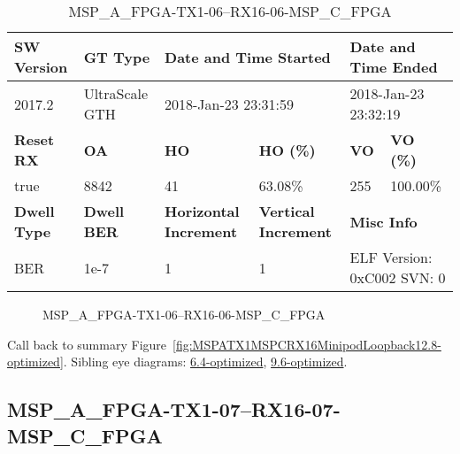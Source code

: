 \begin{table}[h]
\centering
\caption{MSP\_A\_FPGA-TX1-06--RX16-06-MSP\_C\_FPGA}
\label{tab:MSPAFPGATX106RX1606MSPCFPGA12.8-optimized}
\begin{tabular}{@{}|l|l|l|l|l|l|@{}}
\toprule
\textbf{SW Version}                & \textbf{GT Type}   & \multicolumn{2}{l|}{\textbf{Date and Time Started}}            & \multicolumn{2}{l|}{\textbf{Date and Time Ended}}        \\ \midrule
2017.2                       & UltraScale GTH          & \multicolumn{2}{l|}{2018-Jan-23 23:31:59}                   & \multicolumn{2}{l|}{2018-Jan-23 23:32:19}               \\ \midrule
\textbf{Reset RX}                  & \textbf{OA} & \textbf{HO}   & \textbf{HO (\%)} & \textbf{VO} & \textbf{VO (\%)} \\ \midrule
true & 8842        & 41          & 63.08\%        & 255        & 100.00\%       \\ \midrule
\textbf{Dwell Type}                & \textbf{Dwell BER} & \textbf{Horizontal Increment} & \textbf{Vertical Increment}    & \multicolumn{2}{l|}{\textbf{Misc Info}}                  \\ \midrule
BER                            & 1e-7        & 1        & 1           & \multicolumn{2}{l|}{ELF Version: 0xC002 SVN: 0}                         \\ \bottomrule
\end{tabular}
\end{table}

\begin{figure}[h]
\caption{MSP\_A\_FPGA-TX1-06--RX16-06-MSP\_C\_FPGA} \label{fig:MSPAFPGATX106RX1606MSPCFPGA12.8-optimized}
\end{figure}

Call back to summary Figure~\ref{fig:MSPATX1MSPCRX16MinipodLoopback12.8-optimized}.
Sibling eye diagrams: \hyperref[sec:MSPAFPGATX106RX1606MSPCFPGA6.4-optimized]{6.4-optimized}, \hyperref[sec:MSPAFPGATX106RX1606MSPCFPGA9.6-optimized]{9.6-optimized}.

\clearpage
\newpage


\subsection{MSP\_A\_FPGA-TX1-07--RX16-07-MSP\_C\_FPGA}\label{sec:MSPAFPGATX107RX1607MSPCFPGA12.8-optimized}

